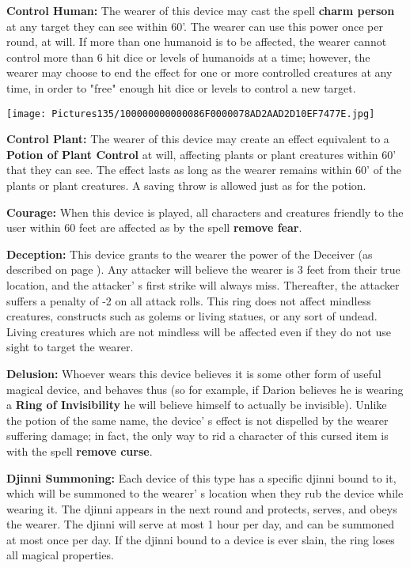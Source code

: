 \documentclass[a4paper,twoside,openany,10pt]{book}
\begin{document}
\begin{multicols}{2}
\textbf{Control Human:} The wearer of this device may cast the spell \textbf{charm person} at any target they can see within 60'. The wearer can use this power once per round, at will. If more than one humanoid is to be affected, the wearer cannot control more than 6 hit dice or levels of humanoids at a time; however, the wearer may choose to end the effect for one or more controlled creatures at any time, in order to "free" enough hit dice or levels to control a new target.

\begin{center}
	\texttt{[image: Pictures135/100000000000086F0000078AD2AAD2D10EF7477E.jpg]}
\end{center}

\textbf{Control Plant:} The wearer of this device may create an effect equivalent to a \textbf{Potion of Plant Control} at will, affecting plants or plant creatures within 60' that they can see. The effect lasts as long as the wearer remains within 60' of the plants or plant creatures. A saving throw is allowed just as for the potion.

\textbf{Courage: }When this device is played, all characters and creatures friendly to the user within 60 feet are affected as by the spell \textbf{remove fear}.

\textbf{Deception:} This device grants to the wearer the power of the Deceiver (as described on page \hyperlink{deceiver-panther-hydra}{\pageref{deceiver-panther-hydra}}). Any attacker will believe the wearer is 3 feet from their true location, and the attacker' s first strike will always miss. Thereafter, the attacker suffers a penalty of -2 on all attack rolls. This ring does not affect mindless creatures, constructs such as golems or living statues, or any sort of undead. Living creatures which are not mindless will be affected even if they do not use sight to target the wearer.

\textbf{Delusion:} Whoever wears this device believes it is some other form of useful magical device, and behaves thus (so for example, if Darion believes he is wearing a \textbf{Ring of Invisibility} he will believe himself to actually be invisible). Unlike the potion of the same name, the device' s effect is not dispelled by the wearer suffering damage; in fact, the only way to rid a character of this cursed item is with the spell \textbf{remove curse}.

\textbf{Djinni Summoning:} Each device of this type has a specific djinni bound to it, which will be summoned to the wearer' s location when they rub the device while wearing it. The djinni appears in the next round and protects, serves, and obeys the wearer. The djinni will serve at most 1 hour per day, and can be summoned at most once per day. If the djinni bound to a device is ever slain, the ring loses all magical properties.


\end{multicols}
\end{document}
